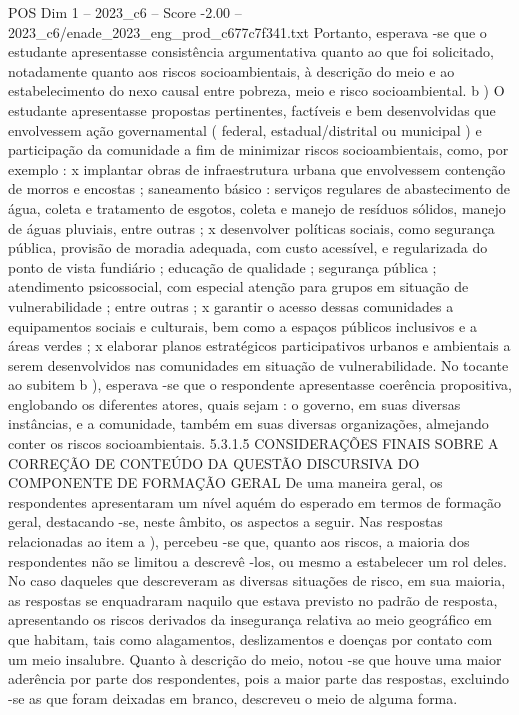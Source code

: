 \begin{textsample}{POS Dim 1 – 2023\_c6 – Score -2.00 – 2023\_c6/enade\_2023\_eng\_prod\_c677c7f341.txt}
Portanto, esperava -se que o estudante apresentasse consistência argumentativa quanto ao que foi solicitado, notadamente quanto aos riscos socioambientais, à descrição do meio e ao estabelecimento do nexo causal entre pobreza, meio e risco socioambiental. b ) O estudante apresentasse propostas pertinentes, factíveis e bem desenvolvidas que envolvessem ação governamental ( federal, estadual/distrital ou municipal ) e participação da comunidade a fim de minimizar riscos socioambientais, como, por exemplo : x implantar obras de infraestrutura urbana que envolvessem contenção de morros e encostas ; saneamento básico : serviços regulares de abastecimento de água, coleta e tratamento de esgotos, coleta e manejo de resíduos sólidos, manejo de águas pluviais, entre outras ; x desenvolver políticas sociais, como segurança pública, provisão de moradia adequada, com custo acessível, e regularizada do ponto de vista fundiário ; educação de qualidade ; segurança pública ; atendimento psicossocial, com especial atenção para grupos em situação de vulnerabilidade ; entre outras ; x garantir o acesso dessas comunidades a equipamentos sociais e culturais, bem como a espaços públicos inclusivos e a áreas verdes ; x elaborar planos estratégicos participativos urbanos e ambientais a serem desenvolvidos nas comunidades em situação de vulnerabilidade.
No tocante ao subitem b ), esperava -se que o respondente apresentasse coerência propositiva, englobando os diferentes atores, quais sejam : o governo, em suas diversas instâncias, e a comunidade, também em suas diversas organizações, almejando conter os riscos socioambientais. 5.3.1.5 CONSIDERAÇÕES FINAIS SOBRE A CORREÇÃO DE CONTEÚDO DA QUESTÃO DISCURSIVA DO COMPONENTE DE FORMAÇÃO GERAL De uma maneira geral, os respondentes apresentaram um nível aquém do esperado em termos de formação geral, destacando -se, neste âmbito, os aspectos a seguir.
Nas respostas relacionadas ao item a ), percebeu -se que, quanto aos riscos, a maioria dos respondentes não se limitou a descrevê -los, ou mesmo a estabelecer um rol deles.
No caso daqueles que descreveram as diversas situações de risco, em sua maioria, as respostas se enquadraram naquilo que estava previsto no padrão de resposta, apresentando os riscos derivados da insegurança relativa ao meio geográfico em que habitam, tais como alagamentos, deslizamentos e doenças por contato com um meio insalubre.
Quanto à descrição do meio, notou -se que houve uma maior aderência por parte dos respondentes, pois a maior parte das respostas, excluindo -se as que foram deixadas em branco, descreveu o meio de alguma forma.

\end{textsample}
